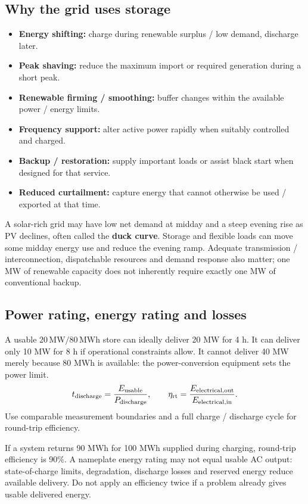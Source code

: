 \documentclass[11pt,a4paper]{article}
\newenvironment{Idea}[1]{\begin{tcolorbox}[colback=pale,colframe=teal,coltitle=white,title={#1}]}{\end{tcolorbox}}
\begin{document}
\subsection{Why the grid uses storage}
\begin{itemize}
\item \textbf{Energy shifting:} charge during renewable surplus / low demand, discharge later.
\item \textbf{Peak shaving:} reduce the maximum import or required generation during a short peak.
\item \textbf{Renewable firming / smoothing:} buffer changes within the available power / energy limits.
\item \textbf{Frequency support:} alter active power rapidly when suitably controlled and charged.
\item \textbf{Backup / restoration:} supply important loads or assist black start when designed for that service.
\item \textbf{Reduced curtailment:} capture energy that cannot otherwise be used / exported at that time.
\end{itemize}
A solar-rich grid may have low net demand at midday and a steep evening rise as PV declines, often called the \textbf{duck curve}. Storage and flexible loads can move some midday energy use and reduce the evening ramp. Adequate transmission / interconnection, dispatchable resources and demand response also matter; one MW of renewable capacity does not inherently require exactly one MW of conventional backup.

\subsection{Power rating, energy rating and losses}
\begin{Idea}{MW answers ``how fast?''; MWh answers ``how long?''}
A usable $20\,\mathrm{MW}/80\,\mathrm{MWh}$ store can ideally deliver 20 MW for 4 h. It can deliver only 10 MW for 8 h if operational constraints allow. It cannot deliver 40 MW merely because 80 MWh is available: the power-conversion equipment sets the power limit.
\[
t_{\rm discharge}=\frac{E_{\rm usable}}{P_{\rm discharge}},\qquad
\eta_{\rm rt}=\frac{E_{\rm electrical,out}}{E_{\rm electrical,in}}.
\]
Use comparable measurement boundaries and a full charge / discharge cycle for round-trip efficiency.
\end{Idea}
If a system returns 90 MWh for 100 MWh supplied during charging, round-trip efficiency is 90\%. A nameplate energy rating may not equal usable AC output: state-of-charge limits, degradation, discharge losses and reserved energy reduce available delivery. Do not apply an efficiency twice if a problem already gives usable delivered energy.
\end{document}
